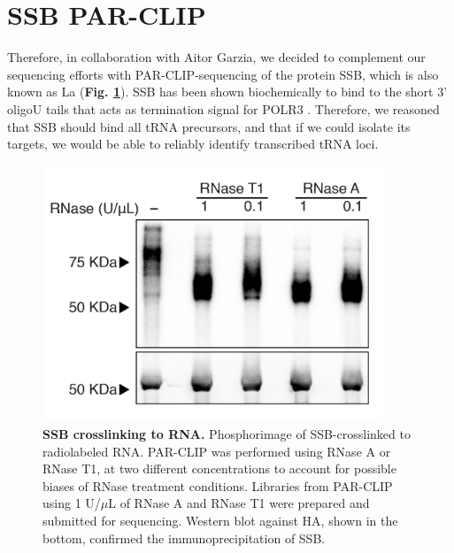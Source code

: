 \documentclass[12pt]{rockefeller}
\begin{document}
\section{SSB PAR-CLIP}
Therefore, in collaboration with Aitor Garzia, we decided to complement our sequencing efforts with PAR-CLIP-sequencing of the protein \gls{SSB}, which is also known as \gls{La} (\textbf{Fig. \ref{paper2b}}). SSB has been shown biochemically to bind to the short 3’ oligoU tails \cite{Stefano:1984wp} that acts as termination signal for POLR3 \cite{Maraia:2010kx}. Therefore, we reasoned that SSB should bind all tRNA precursors, and that if we could isolate its targets, we would be able to reliably identify transcribed tRNA loci. 

\begin{figure}[!ht]%
\centering
\includegraphics[width=4in]{paper2b.png}%
\caption[SSB crosslinking to RNA]
{\textbf{SSB crosslinking to RNA.}
Phosphorimage of SSB-crosslinked to radiolabeled RNA. PAR-CLIP was performed using RNase A or RNase T1, at two different concentrations to 
account for possible biases of RNase treatment conditions. Libraries from PAR-CLIP using 1 U/$\mu$L of RNase A and RNase T1 were prepared and submitted for sequencing. Western blot against HA, shown in the bottom, confirmed the immunoprecipitation of SSB.}
\centering
\label{paper2b}%
\end{figure}
\end{document}
